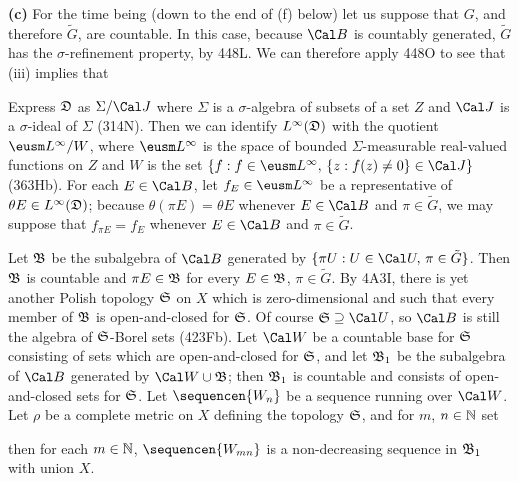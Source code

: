 {\medskip

{\bf (c)} For the time being (down to the end of (f) below) let us
suppose that $G$, and therefore $\tilde G$, are countable.   In this
case, because $\Cal B$ is countably generated,
$\tilde G$ has the $\sigma$-refinement property, by 448L.
We can therefore apply 448O to see that (iii) implies that


Express
$\frak D$ as $\Sigma/\Cal J$ where $\Sigma$ is a $\sigma$-algebra of
subsets of
a set $Z$ and $\Cal J$ is a $\sigma$-ideal of $\Sigma$ (314N).  Then we
can identify $L^{\infty}(\frak D)$ with the quotient $\eusm L^{\infty}/W$,
where $\eusm L^{\infty}$ is the space of bounded $\Sigma$-measurable
real-valued functions on $Z$ and $W$ is the set
$\{f:f\in \eusm L^{\infty},\,\{z:f(z)\ne 0\}\in\Cal J\}$ (363Hb).   For
each $E\in\Cal B$, let $f_E\in\eusm L^{\infty}$ be a representative of
$\theta E\in L^{\infty}(\frak D)$;  because $\theta(\pi E)=\theta E$
whenever $E\in\Cal B$ and $\pi\in\tilde G$, we may suppose that
$f_{\pi E}=f_E$ whenever $E\in\Cal B$ and $\pi\in\tilde G$.

Let $\frak B$ be the subalgebra of $\Cal B$ generated by
$\{\pi U:U\in\Cal U,\,\pi\in\tilde G\}$.   Then $\frak B$ is countable
and $\pi E\in\frak B$ for every $E\in\frak B$, $\pi\in \tilde G$.   By
4A3I, there is yet
another Polish topology $\frak S$ on $X$ which is zero-dimensional
and
such that every member of $\frak B$ is open-and-closed for $\frak S$.
Of course $\frak S\supseteq\Cal U$, so $\Cal B$ is still the algebra of
$\frak S$-Borel sets (423Fb).   Let $\Cal W$ be a countable base
for $\frak S$ consisting of sets which are open-and-closed for
$\frak S$, and let $\frak B_1$ be the subalgebra of $\Cal B$ generated
by $\Cal W\cup\frak B$;  then $\frak B_1$ is countable and consists of
open-and-closed sets for $\frak S$.   Let $\sequencen{W_n}$ be a
sequence running over $\Cal W$.   Let $\rho$ be a complete metric on $X$
defining the topology $\frak S$, and for $m$, $n\in\Bbb N$ set


\noindent then for each $m\in\Bbb N$, $\sequencen{W_{mn}}$ is a
non-decreasing sequence in $\frak B_1$ with union $X$.

}
